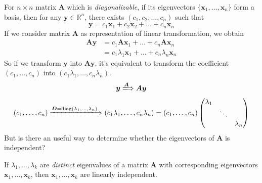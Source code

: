 For $n\times n$ matrix $\bm A$ which is \textit{diagonalizable}, if its eigenvectors $\{\bm x_1,\dots,\bm x_n\}$ form a basis, then for any $\bm y\in\mathbb{R}^{n}$, there exists $(c_1,c_2,\dots,c_n)$ such that
\[
\bm y=c_1\bm x_1+c_2\bm x_2+\dots+c_n\bm x_n
\]
If we consider matrix $\bm A$ as representation of linear transformation, we obtain
\begin{align*}
\bm{Ay}&=c_1\bm A\bm x_1+\dots+c_n\bm A\bm x_n\\
&=c_1\lambda_1\bm x_1+\dots+c_n\lambda_n\bm x_n
\end{align*}
So if we transform $\bm y$ into $\bm{Ay}$, it's equivalent to transform the coefficient $(c_1,\dots,c_n)$ into $(c_1\lambda_1,\dots,c_n\lambda_n)$.
\begin{gather*}
\bm y\xLongrightarrow{\bm A}\bm{Ay}
\\
(c_1,\dots,c_n)\xLongrightarrow{\bm D=\diag(\lambda_1,\dots,\lambda_n)}
(c_1\lambda_1,\dots,c_n\lambda_n)=(c_1,\dots,c_n)\begin{pmatrix}
\lambda_1&&\\&\ddots&\\&&\lambda_n
\end{pmatrix}
\end{gather*}
But is there an useful way to determine whether the eigenvectors of $\bm A$ is independent?
\newpage
\begin{theorem}
If $\lambda_1,\dots,\lambda_k$ are \textit{distinct} eigenvalues of a matrix $\bm A$ with corresponding eigenvectors $\bm x_1,\dots,\bm x_k$, then $\bm x_1,\dots,\bm x_k$ are linearly independent.
\end{theorem}
